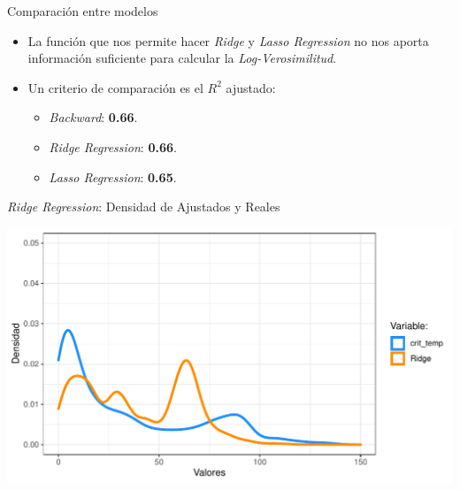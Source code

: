 \documentclass[11pt]{beamer}\usepackage{knitr}
\begin{document}
\begin{frame}{Comparación entre modelos}
	\begin{itemize}
		\item La función que nos permite hacer \textit{Ridge} y \textit{Lasso Regression} no nos aporta información suficiente para calcular la \textit{Log-Verosimilitud}.
		\pause
		\item Un criterio de comparación es el $R^2$ ajustado:
		\pause
		\begin{itemize}
			\item \textit{Backward}: \textbf{0.66}.
			\item \textit{Ridge Regression}: \textbf{0.66}.
			\item \textit{Lasso Regression}: \textbf{0.65}.
		\end{itemize}
	\end{itemize}
\end{frame}

\begin{frame}[fragile]{\textit{Ridge Regression}: Densidad de Ajustados y Reales}

\begin{knitrout}\footnotesize
{}\color{fgcolor}

{\centering \includegraphics[width=\maxwidth]{figure/unnamed-chunk-9-1} 

}



\end{knitrout}


	\end{frame}
\end{document}
